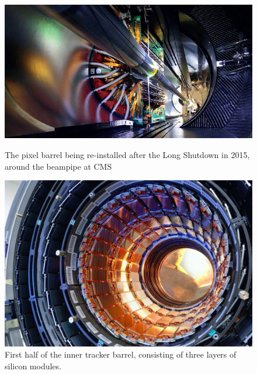 {  
       \begin{figure}[ht]
  	\centering
  	\begin{minipage}[b]{0.4\textwidth}
  		\includegraphics[width=\textwidth]{2_ExperimentalSetup/Figures/cmspixel}
  		\caption{The pixel barrel being re-installed after the Long Shutdown in 2015, around the beampipe at CMS\cite{Christine:2024986}}
  	\end{minipage}
  	\hfill
  	\begin{minipage}[b]{0.4\textwidth}
  		\includegraphics[width=\textwidth]{2_ExperimentalSetup/Figures/cmsbarrel}
  		\caption{First half of the inner tracker barrel, consisting of three layers of silicon modules.\cite{beautiful:1998635}}
  	\end{minipage}
  	\label{fig:Trackpics}
  \end{figure}
  
  
  
}
